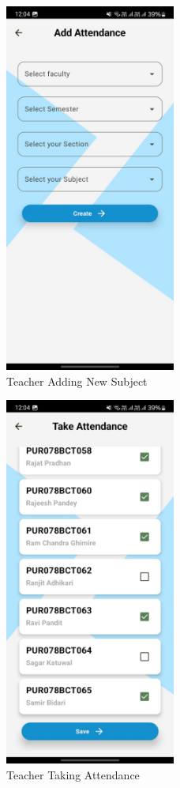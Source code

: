 \begin{figure}[H]
    \centering
    \includegraphics[width=0.5\textwidth]{Graphics/output/teacher_add_subject.jpg}
    \caption{Teacher Adding New Subject}
    \label{fig:teacher_add_subject}
\end{figure}

\begin{figure}[H]
    \centering
    \includegraphics[width=0.5\textwidth]{Graphics/output/teacher_take_attendance.jpg}
    \caption{Teacher Taking Attendance}
    \label{fig:teacher_take_attendance}
\end{figure}

